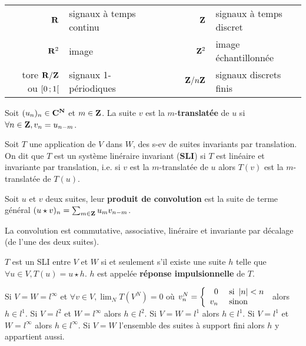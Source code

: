 \begin{defn}
	\begin{tabular}{rlcrl}
	$\mathbf{R}$ & signaux à temps continu & $\qquad$ & $\mathbf{Z}$ & signaux à temps discret \\
	$\mathbf{R}^2$ & image & $\qquad$ & $\mathbf{Z}^2$ & image échantillonnée \\
	tore $\mathbf{R} / \mathbf{Z}$ ou $\mathopen{}\mathclose{\left[0\mathclose{}\mathpunct{};1\right[}$ & signaux 1-périodiques & $\qquad$ & $\mathbf{Z} / n\mathbf{Z}$ & signaux discrets finis
	\end{tabular}
\end{defn}

\begin{defn}
	Soit $(u_n)_n \in \mathbf{C}^{\mathbf{N}}$ et $m \in \mathbf{Z}$.
	La suite $v$ est la $m$-\textbf{translatée} de $u$ si $\forall n \in \mathbf{Z}, v_n = u_{n - m}$.
\end{defn}

\begin{defn}
	Soit $T$ une application de $V$ dans $W$, des s-ev de suites invariants par translation.
	On dit que $T$ est un système linéraire invariant (\textbf{SLI}) si $T$ est linéaire et invariante par translation, i.e. si $v$ est la $m$-translatée de $u$ alors $T(v)$ est la $m$-translatée de $T(u)$.
\end{defn}

\begin{defn}
	Soit $u$ et $v$ deux suites, leur \textbf{produit de convolution} est la suite de terme général $(u \star v)_n = \sum_{m \in \mathbf{Z}} u_m v_{n-m}$.
\end{defn}

\begin{pop}
	La convolution est commutative, associative, linéraire et invariante par décalage (de l'une des deux suites).
\end{pop}

\begin{thm}
	$T$ est un SLI entre $V$ et $W$ si et seulement s'il existe une suite $h$ telle que $\forall u \in V, T(u) = u \star h$.
	$h$ est appelée \textbf{réponse impulsionnelle} de $T$.
\end{thm}

\begin{ex}
	Si $V = W = l^\infty$ et $\forall v \in V, \lim_N T \left( V^N \right) = 0$ où $v_n^N =
		\left\{\begin{array}{rl}
			0 & \text{ si } \left\lvert n\right\rvert < n \\
			v_n & \text{ sinon}
		\end{array}\right.$
	alors $h \in l^1$.
	Si $V = l^2$ et $W = l^\infty$ alors $h \in l^2$.
	Si $V = W = l^1$ alors $h \in l^1$.
	Si $V = l^1$ et $W = l^\infty$ alors $h \in l^\infty$.
	Si $V = W$ l'ensemble des suites à support fini alors $h$ y appartient aussi.
\end{ex}

